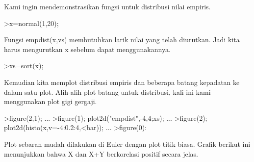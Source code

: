 \documentclass[a4paper,10pt]{article}
\begin{document}
\begin{eulernotebook}
\begin{eulercomment}
\begin{eulercomment}
\begin{eulercomment}
\begin{eulercomment}
\begin{eulercomment}
\begin{eulercomment}
\begin{eulercomment}
\begin{eulercomment}
\begin{eulercomment}
\begin{eulercomment}
\begin{eulercomment}
\begin{eulercomment}
\begin{eulercomment}
\begin{eulercomment}
\begin{eulercomment}
\begin{eulercomment}
\begin{eulercomment}
\begin{eulercomment}
\begin{eulercomment}
\begin{eulercomment}
\begin{eulercomment}
\begin{eulercomment}
\begin{eulercomment}
\begin{eulercomment}
\begin{eulercomment}
\begin{eulercomment}
\begin{eulercomment}
\begin{eulercomment}
\begin{eulercomment}
\begin{eulercomment}
\begin{eulercomment}
\begin{eulercomment}
\begin{eulercomment}
\begin{eulercomment}
\begin{eulercomment}
\begin{eulercomment}
\begin{eulercomment}
\begin{eulercomment}
\begin{eulercomment}
\begin{eulercomment}
\begin{eulercomment}
\begin{eulercomment}
\begin{eulercomment}
\begin{eulercomment}
\begin{eulercomment}
Kami ingin mendemonstrasikan fungsi untuk distribusi nilai empiris.
\end{eulercomment}
\begin{eulerprompt}
>x=normal(1,20);
\end{eulerprompt}
\begin{eulercomment}
Fungsi empdist(x,vs) membutuhkan larik nilai yang telah diurutkan.
Jadi kita harus mengurutkan x sebelum dapat menggunakannya.
\end{eulercomment}
\begin{eulerprompt}
>xs=sort(x);
\end{eulerprompt}
\begin{eulercomment}
Kemudian kita memplot distribusi empiris dan beberapa batang kepadatan
ke dalam satu plot. Alih-alih plot batang untuk distribusi, kali ini
kami menggunakan plot gigi gergaji.
\end{eulercomment}
\begin{eulerprompt}
>figure(2,1); ...
>figure(1); plot2d("empdist",-4,4;xs); ...
>figure(2); plot2d(histo(x,v=-4:0.2:4,<bar));  ...
>figure(0):
\end{eulerprompt}
\begin{eulercomment}
Plot sebaran mudah dilakukan di Euler dengan plot titik biasa. Grafik
berikut ini menunjukkan bahwa X dan X+Y berkorelasi positif secara
jelas.
\end{eulercomment}
\begin{eulerprompt}

\end{eulerprompt}
\end{eulercomment}
\end{eulercomment}
\end{eulercomment}
\end{eulercomment}
\end{eulercomment}
\end{eulercomment}
\end{eulercomment}
\end{eulercomment}
\end{eulercomment}
\end{eulercomment}
\end{eulercomment}
\end{eulercomment}
\end{eulercomment}
\end{eulercomment}
\end{eulercomment}
\end{eulercomment}
\end{eulercomment}
\end{eulercomment}
\end{eulercomment}
\end{eulercomment}
\end{eulercomment}
\end{eulercomment}
\end{eulercomment}
\end{eulercomment}
\end{eulercomment}
\end{eulercomment}
\end{eulercomment}
\end{eulercomment}
\end{eulercomment}
\end{eulercomment}
\end{eulercomment}
\end{eulercomment}
\end{eulercomment}
\end{eulercomment}
\end{eulercomment}
\end{eulercomment}
\end{eulercomment}
\end{eulercomment}
\end{eulercomment}
\end{eulercomment}
\end{eulercomment}
\end{eulercomment}
\end{eulercomment}
\end{eulercomment}
\end{eulernotebook}
\end{document}
